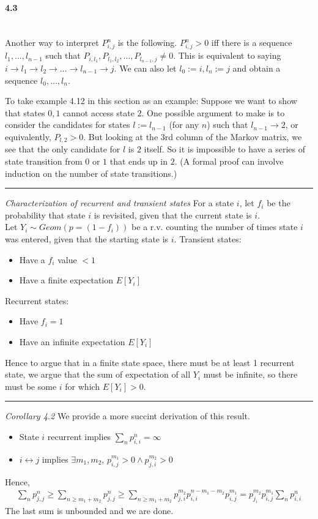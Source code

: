 \documentclass[a4paper]{article}
\newcommand{\divider}[0]{\begin{center}
\rule{16cm}{0.5pt}
\end{center}}
\begin{document}
\paragraph{4.3}\mbox{}\\
Another way to interpret $P_{i,j}^n$ is the following. $P_{i,j}^n > 0$ iff there is a sequence $l_1,\dots,l_{n-1}$ such that $P_{i,l_1},P_{l_1,l_2},\dots,P_{l_{n-1},j}\neq 0$. This is equivalent to saying $i\rightarrow l_1\rightarrow l_2\rightarrow\dots\rightarrow l_{n-1}\rightarrow j$. We can also let $l_0 := i, l_n := j$ and obtain a sequence $l_0,\dots,l_n$.

To take example 4.12 in this section as an example: Suppose we want to show that states $0,1$ cannot access state $2$. One possible argument to make is to consider the candidates for states $l:=l_{n-1}$ (for any $n$) such that $l_{n-1}\rightarrow 2$, or equivalently, $P_{l,2} > 0$. But looking at the 3rd column of the Markov matrix, we see that the only candidate for $l$ is $2$ itself. So it is impossible to have a series of state transition from $0$ or $1$ that ends up in $2$. (A formal proof can involve induction on the number of state transitions.)

\divider

\emph{Characterization of recurrent and transient states}
For a state $i$, let $f_i$ be the probability that state $i$ is revisited, given that the current state is $i$.\\
Let $Y_i\sim Geom(p=(1-f_i))$ be a r.v. counting the number of times state $i$ was entered, given that the starting state is $i$.
Transient states:
\begin{itemize}
    \item Have a $f_i$ value $<1$
    \item Have a finite expectation $E[Y_i]$ 
\end{itemize}
Recurrent states:
\begin{itemize}
    \item Have $f_i = 1$
    \item Have an infinite expectation $E[Y_i]$
\end{itemize}
Hence to argue that in a finite state space, there must be at least 1 recurrent state, we argue that the sum of expectation of all $Y_i$ must be infinite, so there must be some $i$ for which $E[Y_i] > 0$.

\divider

\emph{Corollary 4.2} We provide a more succint derivation of this result.
\begin{itemize}
    \item State $i$ recurrent implies $\sum_n p_{i,i}^n=\infty$
    \item $i\leftrightarrow j$ implies $\exists m_1,m_2$, $p_{i,j}^{m_1} > 0\land p_{j,i}^{m_2} > 0$
\end{itemize}
Hence,
\begin{align*}
    \sum_n p_{j,j}^n\geq \sum_{n\geq m_1 + m_2}p_{j,j}^n \geq \sum_{n\geq m_1 + m_2}p_{j,i}^{m_2}p_{i,i}^{n-m_1-m_2}p_{i,j}^{m_1} = p_{j_i}^{m_2}p_{i,j}^{m_1}\sum_n p_{i,i}^n
\end{align*}
The last sum is unbounded and we are done.
\end{document}

